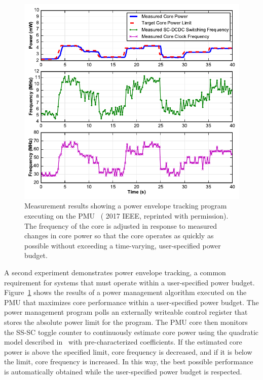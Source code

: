 \documentclass[graybox]{svmult}
\begin{document}
\begin{figure}
  \centering
  \includegraphics[width=\textwidth]{6-raven4-power-tracking}
  \caption{Measurement results showing a power envelope tracking program executing on the PMU~\cite{Keller2017} ({\textcopyright} 2017 IEEE, reprinted with permission). The frequency of the core is adjusted in response to measured changes in core power so that the core operates as quickly as possible without exceeding a time-varying, user-specified power budget.}
  \label{fig:6-raven4-power-tracking}
\end{figure}

A second experiment demonstrates power envelope tracking, a common requirement for systems that must operate within a user-specified power budget.
Figure~\ref{fig:6-raven4-power-tracking} shows the results of a power management algorithm executed on the PMU that maximizes core performance within a user-specified power budget.
The power management program polls an externally writeable control register that stores the absolute power limit for the program.
The PMU core then monitors the SS-SC toggle counter to continuously estimate core power using the quadratic model described in~\cite{Cochet2016} with pre-characterized coefficients.
If the estimated core power is above the specified limit, core frequency is decreased, and if it is below the limit, core frequency is increased.
In this way, the best possible performance is automatically obtained while the user-specified power budget is respected.
\end{document}
